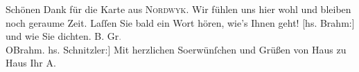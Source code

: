 \begin{ledgroupsized}[t]{13cm}
           {\pb}Schönen Dank für die Karte aus \textsc{Nordwyk}. Wir fühlen uns hier wohl und bleiben noch geraume Zeit. Laſſen Sie bald ein
               Wort hören, wie’s Ihnen geht! {[}hs. Brahm:{]} und wie Sie dichten.\pend
           \pstart
           B. Gr\textcolor{gray}{.}{\\}\spacefill\mbox{OBrahm.}\pend
           \pstart {[}hs. Schnitzler:{]} Mit herzlichen So{\geminationm}erwünſchen und Grüßen von Haus zu Haus Ihr \spacefill\mbox{A.}\pend{}\pstart
           \raggedleft{}\label{T_L03013-1v}\label{T_L03013-1h}\pend
           
         
         \endnumbering{}\end{ledgroupsized}  \newcommand{\dateiname}{L03013}\newcommand{\titel}{Arthur Schnitzler und Otto Brahm an Felix Salten, 19. 7. 1908}\newcommand{\editorInnen}{Martin Anton Müller und Laura Untner}
      